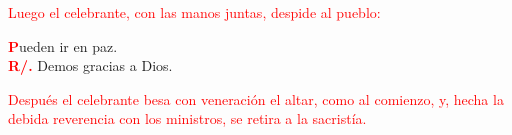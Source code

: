 \documentclass[12pt, letterpaper]{article}
\begin{document}
  \large{\textcolor{red}{Luego el celebrante, con las manos juntas, despide al pueblo:}}

  \lettrine[lines=1]{\bfseries \textcolor{red}{P}}{}\Large ueden ir en paz.\\
  \noindent
  \Large {\bfseries \textcolor{red}{R/.}} \hspace{0.5cm} Demos gracias a Dios.

  \large{\textcolor{red}{Despu\'es el celebrante besa con veneraci\'on el altar, como al comienzo, y, hecha la debida reverencia con los ministros, se retira a la sacrist\'ia.}}
\end{document}
